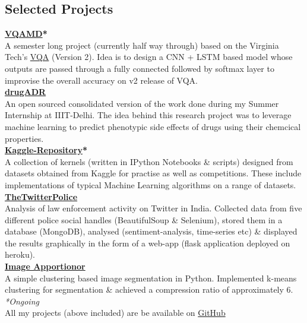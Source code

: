 \documentclass[margin,line]{res}
\begin{document}
\begin{resume}
\section{\sc Selected Projects}
{\bf {\href{https://github.com/sominwadhwa/VQAMD}{\color{blue} VQAMD}*}}\\
A semester long project (currently half way through) based on the Virginia Tech's {\href{http://visualqa.org/}{\color{blue} VQA}} (Version 2). Idea is to design a CNN + LSTM based model whose outputs are passed through a fully connected followed by softmax layer to improvise the overall accuracy on v2 release of VQA. \\
{\bf {\href{https://github.com/sominwadhwa/drugADR}{\color{blue} drugADR}}}\\
An open sourced consolidated version of the work done during my Summer Internship at IIIT-Delhi. The idea behind this research project was to leverage machine learning to predict phenotypic side effects of drugs using their chemcical properties.\\
{\bf {\href{https://github.com/sominwadhwa/Kaggle}{\color{blue} Kaggle-Repository}*}}\\
A collection of kernels (written in IPython Notebooks \& scripts) designed from datasets obtained from Kaggle for practise as well as competitions. These include implementations of typical Machine Learning algorithms on a range of datasets.\\
{\bf {\href{https://github.com/sominwadhwa/TheTwitterPolice}{\color{blue} TheTwitterPolice}}}\\
Analysis of law enforcement activity on Twitter in India. Collected data from five different police social handles (BeautifulSoup \& Selenium), stored them in a database (MongoDB), analysed (sentiment-analysis, time-series etc) \& displayed the results graphically in the form of a web-app (flask application deployed on heroku).\\
{\bf {\href{https://github.com/sominwadhwa/Image-Apportionor}{\color{blue} Image Apportionor}}}\\
A simple clustering based image segmentation in Python. Implemented k-means clustering for segmentation \& achieved a compression ratio of approximately 6.\\
\textit{*Ongoing}\\
All my projects (above included) are be available on {\href{https://github.com/sominwadhwa}{\color{blue}GitHub}}


\end{resume}
\end{document}
